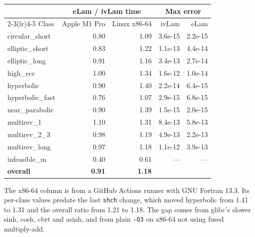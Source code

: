 \documentclass[11pt]{article}
\newcommand{\code}[1]{\texttt{#1}}
\begin{document}
\begin{center}
\small
\begin{tabular}{l r r r r}
\toprule
& \multicolumn{2}{c}{eLam / ivLam time} & \multicolumn{2}{c}{Max error} \\
\cmidrule(lr){2-3}\cmidrule(lr){4-5}
Class & Apple M1 Pro & Linux x86-64 & ivLam & eLam \\
\midrule
circular\_short  & 0.80 & 1.09 & 3.6e-15 & 2.2e-15 \\
elliptic\_short  & 0.83 & 1.22 & 1.1e-13 & 4.4e-14 \\
elliptic\_long   & 0.91 & 1.16 & 3.4e-13 & 2.7e-14 \\
high\_ecc        & 1.00 & 1.34 & 1.6e-12 & 1.0e-14 \\
hyperbolic       & 0.90 & 1.40 & 2.2e-14 & 6.4e-15 \\
hyperbolic\_fast & 0.76 & 1.07 & 2.9e-15 & 6.8e-15 \\
near\_parabolic  & 0.90 & 1.39 & 1.5e-15 & 2.0e-15 \\
multirev\_1      & 1.10 & 1.31 & 8.4e-13 & 5.8e-13 \\
multirev\_2\_3   & 0.98 & 1.19 & 4.9e-13 & 2.2e-13 \\
multirev\_long   & 0.97 & 1.18 & 1.1e-12 & 3.9e-13 \\
infeasible\_m    & 0.40 & 0.61 & --- & --- \\
\midrule
\textbf{overall} & \textbf{0.91} & \textbf{1.18} & & \\
\bottomrule
\end{tabular}
\end{center}

The x86-64 column is from a GitHub Actions runner with GNU Fortran 13.3. Its per-class values predate the last \code{shch} change, which moved hyperbolic from 1.41 to 1.31 and the overall ratio from 1.21 to 1.18. The gap comes from glibc's slower sinh, cosh, cbrt and asinh, and from plain \code{-O3} on x86-64 not using fused multiply-add.
\end{document}

